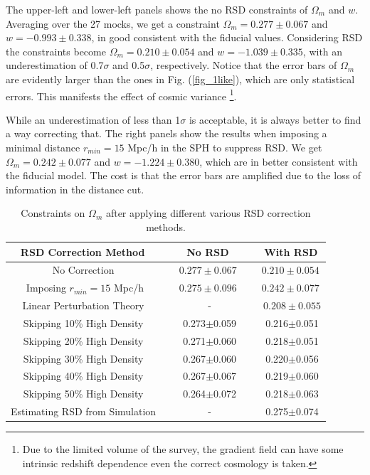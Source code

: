 \documentclass{emulateapj}
\begin{document}
The upper-left and lower-left panels shows the no RSD constraints of $\Omega_m$ and $w$.
Averaging over the 27 mocks, we get a constraint $\Omega_m=0.277\pm0.067$ and $w=-0.993\pm0.338$,
in good consistent with the fiducial values.
Considering RSD the constraints become $\Omega_m=0.210\pm0.054$ and $w=-1.039\pm0.335$,
with an underestimation of 0.7$\sigma$ and 0.5$\sigma$, respectively.
Notice that the error bars of $\Omega_m$ are evidently larger than the ones in Fig. (\ref{fig_1like}),
which are only statistical errors.
This manifests the effect of cosmic variance
\footnote{Due to the limited volume of the survey, 
the gradient field can have some intrinsic redshift dependence even the correct cosmology is taken.}.

While an underestimation of less than 1$\sigma$ is acceptable,
it is always better to find a way correcting that.
The right panels show the results when imposing a minimal distance $r_{min}=15$ Mpc/h in the SPH to suppress RSD.
We get $\Omega_m=0.242\pm0.077$ and $w=-1.224\pm0.380$, which are in better consistent with the fiducial model.
The cost is that the error bars are amplified due to the loss of information in the distance cut.

\begin{table}
\begin{center}
\caption{Constraints on $\Omega_m$ after applying different various RSD correction methods. }
\begin{tabular}{|c|c|c|}
\hline
RSD Correction Method       ~&~No RSD      ~&~With RSD \\
\hline
No Correction        ~&~$0.277\pm0.067$ ~&~$0.210\pm0.054$    \\
\hline
Imposing $r_{min}=15$ Mpc/h~&~$0.275\pm0.096$ ~&~$0.242\pm0.077$ \\
\hline
Linear Perturbation Theory ~&~ -  ~&~ $0.208\pm0.055$ \\
\hline
Skipping 10\% High Density ~&~ 0.273$\pm$0.059 ~&~  0.216$\pm$0.051 \\
\hline
Skipping 20\% High Density ~&~ 0.271$\pm$0.060 ~&~  0.218$\pm$0.051 \\
\hline
Skipping 30\% High Density ~&~ 0.267$\pm$0.060 ~&~  0.220$\pm$0.056 \\
\hline
Skipping 40\% High Density ~&~ 0.267$\pm$0.067 ~&~  0.219$\pm$0.060 \\
\hline
Skipping 50\% High Density ~&~ 0.264$\pm$0.072 ~&~  0.218$\pm$0.063 \\
\hline
Estimating RSD from Simulation  ~&~ - ~&~  0.275$\pm$0.074 \\
\hline
\end{tabular}\label{Table1}
\end{center}
\end{table}
\end{document}
